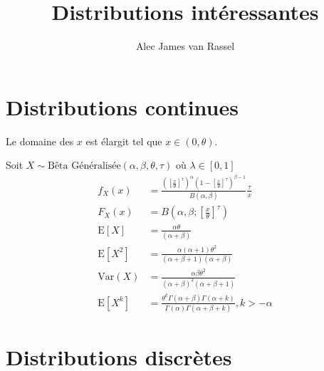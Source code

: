 \documentclass[12pt, titlepage,french]{article}
\begin{document}
\title{Distributions intéressantes}
\vspace{-8ex}
\date{}
\author{Alec James van Rassel}
\maketitle

\tableofcontents
\clearpage

\section{Distributions continues}


\begin{distributions}
Le domaine des $x$ est élargit tel que $x \in (0, \theta)$.

Soit $X \sim \text{Bêta Généralisée}(\alpha, \beta, \theta, \tau)$ où $\lambda \in [0, 1]$
	\begin{align*}
	f_{X}(x)
	&=	\frac{\left(\left[\frac{x}{\theta}\right]^{\tau}\right)^{\alpha} \left(1 - \left[\frac{x}{\theta}\right]^{\tau}\right)^{\beta - 1}}{B(\alpha, \beta)}\frac{\tau}{x}	\\
	F_{X}(x)
	&=	B\left(\alpha, \beta; \left[\frac{x}{\theta}\right]^{\tau}\right)	\\
	\text{E}[X]
	&=	\frac{\alpha \theta}{(\alpha + \beta)}	\\
	\text{E}[X^{2}]
	&=	\frac{\alpha (\alpha + 1) \theta^{2}}{(\alpha + \beta + 1)(\alpha + \beta )}	\\
	\text{Var}(X)
	&=	\frac{\alpha \beta \theta^{2}}{(\alpha + \beta )^{2}(\alpha + \beta + 1)}	\\
	\text{E}[X^{k}]
	&=	\frac{\theta^{k} \Gamma(\alpha + \beta) \Gamma(\alpha + k)}{\Gamma(\alpha) \Gamma(\alpha + \beta + k)}, k > -\alpha
	\end{align*}
\end{distributions}

\clearpage
\section{Distributions discrètes}
\end{document}

